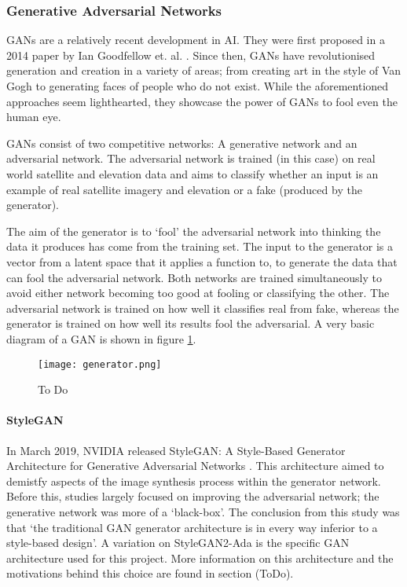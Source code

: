 \documentclass[a4paper]{report}
\begin{document}
\subsubsection{Generative Adversarial Networks}
GANs are a relatively recent development in AI. They were first proposed in a 2014 paper by Ian Goodfellow et. al. \cite{goodfellow2014generative}. Since then, GANs have revolutionised generation and creation in a variety of areas; from creating art in the style of Van Gogh \cite{gangogh} to generating faces of people who do not exist\cite{persondoesnotexist}. While the aforementioned approaches seem lighthearted, they showcase the power of GANs to fool even the human eye.

GANs consist of two competitive networks: A generative network and an adversarial network. The adversarial network is trained (in this case) on real world satellite and elevation data and aims to classify whether an input is an example of real satellite imagery and elevation or a fake (produced by the generator).

The aim of the generator is to `fool' the adversarial network into thinking the data it produces has come from the training set. The input to the generator is a vector from a latent space that it applies a function to, to generate the data that can fool the adversarial network. Both networks are trained simultaneously to avoid either network becoming too good at fooling or classifying the other. The adversarial network is trained on how well it classifies real from fake, whereas the generator is trained on how well its results fool the adversarial. A very basic diagram of a GAN is shown in figure \ref{fig:gan}.

\begin{figure}[H]
    \centering
        \texttt{[image: generator.png]}
        \caption{To Do}
        \label{fig:gan}
\end{figure}

\paragraph{StyleGAN}
In March 2019, NVIDIA released StyleGAN: A Style-Based Generator Architecture for Generative Adversarial Networks \cite{ToDo}. This architecture aimed to demistfy aspects of the image synthesis process within the generator network. Before this, studies largely focused on improving the adversarial network; the generative network was more of a `black-box'. The conclusion from this study was that `the traditional GAN generator architecture is in every way inferior to a style-based design'. A variation on StyleGAN2-Ada \cite{ToDo} is the specific GAN architecture used for this project. More information on this architecture and the motivations behind this choice are found in section (ToDo).
\end{document}
